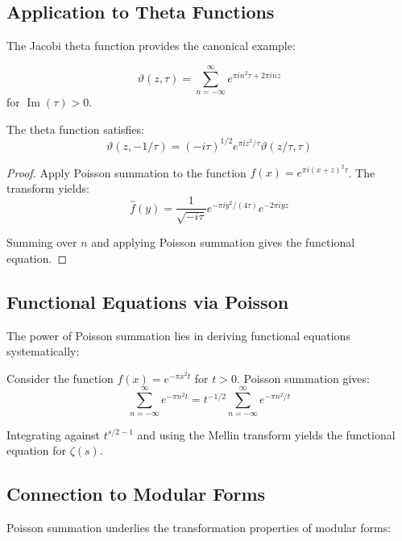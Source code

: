\subsection{Application to Theta Functions}

The Jacobi theta function provides the canonical example:

\begin{definition}
$$\vartheta(z, \tau) = \sum_{n=-\infty}^{\infty} e^{\pi i n^2 \tau + 2\pi i n z}$$
for $\operatorname{Im}(\tau) > 0$.
\end{definition}

\begin{theorem}
The theta function satisfies:
$$\vartheta(z, -1/\tau) = (-i\tau)^{1/2} e^{\pi i z^2/\tau} \vartheta(z/\tau, \tau)$$
\end{theorem}

\begin{proof}
Apply Poisson summation to the function $f(x) = e^{\pi i (x+z)^2 \tau}$. The transform yields:
$$\hat{f}(y) = \frac{1}{\sqrt{-i\tau}} e^{-\pi i y^2/(4\tau)} e^{-2\pi i y z}$$

Summing over $n$ and applying Poisson summation gives the functional equation.
\end{proof}

\subsection{Functional Equations via Poisson}

The power of Poisson summation lies in deriving functional equations systematically:

\begin{example}
Consider the function $f(x) = e^{-\pi x^2 t}$ for $t > 0$. Poisson summation gives:
$$\sum_{n=-\infty}^{\infty} e^{-\pi n^2 t} = t^{-1/2} \sum_{n=-\infty}^{\infty} e^{-\pi n^2/t}$$

Integrating against $t^{s/2-1}$ and using the Mellin transform yields the functional equation for $\zeta(s)$.
\end{example}

\subsection{Connection to Modular Forms}

Poisson summation underlies the transformation properties of modular forms:


